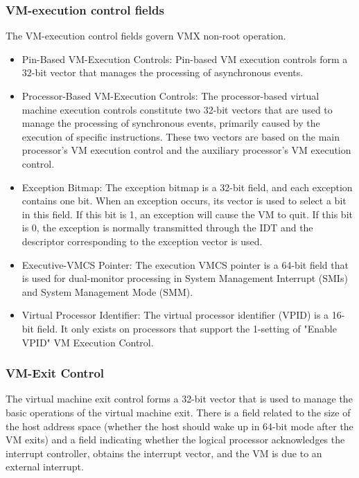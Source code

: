 \documentclass[onecolumn, draftclsnofoot,10pt, compsoc]{IEEEtran}
\begin{document}
	\subsubsection{VM-execution control fields}
     The VM-execution control fields govern VMX non-root operation. 
    \begin{itemize}
	\item Pin-Based VM-Execution Controls:
   	Pin-based VM execution controls form a 32-bit vector that manages the processing of asynchronous events.
	\item Processor-Based VM-Execution Controls:
    The processor-based virtual machine execution controls constitute two 32-bit vectors that are used to manage the processing of synchronous events, primarily caused by the execution of specific instructions. These two vectors are based on the main processor's VM execution control and the auxiliary processor's VM execution control.
	\item Exception Bitmap: 
    The exception bitmap is a 32-bit field, and each exception contains one bit. When an exception occurs, its vector is used to select a bit in this field. If this bit is 1, an exception will cause the VM to quit. If this bit is 0, the exception is normally transmitted through the IDT and the descriptor corresponding to the exception vector is used.
	\item  Executive-VMCS Pointer:
    The execution VMCS pointer is a 64-bit field that is used for dual-monitor processing in System Management Interrupt (SMIs) and System Management Mode (SMM).
    \item Virtual Processor Identifier:
    The virtual processor identifier (VPID) is a 16-bit field. It only exists on processors that support the 1-setting of "Enable VPID" VM Execution Control.
	\end{itemize}
   
   	\subsubsection{VM-Exit Control}
    The virtual machine exit control forms a 32-bit vector that is used to manage the basic operations of the virtual machine exit. There is a field related to the size of the host address space (whether the host should wake up in 64-bit mode after the VM exits) and a field indicating whether the logical processor acknowledges the interrupt controller, obtains the interrupt vector, and the VM is due to an external interrupt.
    
\end{document}
